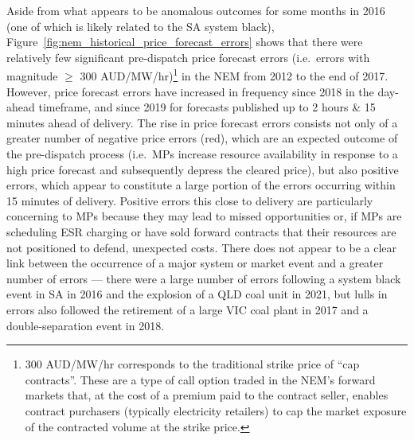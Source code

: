 \documentclass[12pt,a4paper,]{report}
\begin{document}
Aside from what appears to be anomalous outcomes for some months in 2016
(one of which is likely related to the SA system black),
Figure~\ref{fig:nem_historical_price_forecast_errors} shows that there
were relatively few significant pre-dispatch price forecast errors
(i.e.~errors with magnitude \(\geq\) 300 AUD/MW/hr)\footnote{300
  AUD/MW/hr corresponds to the traditional strike price of ``cap
  contracts''. These are a type of call option traded in the NEM's
  forward markets that, at the cost of a premium paid to the contract
  seller, enables contract purchasers (typically electricity retailers)
  to cap the market exposure of the contracted volume at the strike
  price.} in the NEM from 2012 to the end of 2017. However, price
forecast errors have increased in frequency since 2018 in the day-ahead
timeframe, and since 2019 for forecasts published up to 2 hours \& 15
minutes ahead of delivery. The rise in price forecast errors consists
not only of a greater number of negative price errors (red), which are
an expected outcome of the pre-dispatch process (i.e.~MPs increase
resource availability in response to a high price forecast and
subsequently depress the cleared price), but also positive errors, which
appear to constitute a large portion of the errors occurring within 15
minutes of delivery. Positive errors this close to delivery are
particularly concerning to MPs because they may lead to missed
opportunities or, if MPs are scheduling ESR charging or have sold
forward contracts that their resources are not positioned to defend,
unexpected costs. There does not appear to be a clear link between the
occurrence of a major system or market event and a greater number of
errors --- there were a large number of errors following a system black
event in SA in 2016 and the explosion of a QLD coal unit in 2021, but
lulls in errors also followed the retirement of a large VIC coal plant
in 2017 and a double-separation event in 2018.
\end{document}
